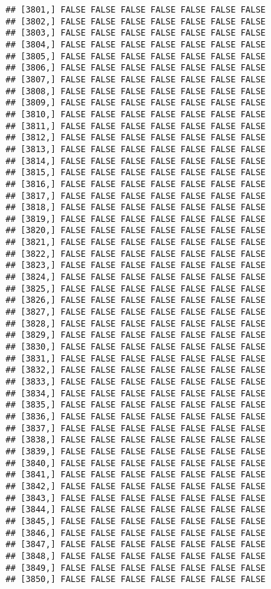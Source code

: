 \documentclass[
]{article}
\begin{document}
\begin{verbatim}
## [3801,] FALSE FALSE FALSE FALSE FALSE FALSE FALSE
## [3802,] FALSE FALSE FALSE FALSE FALSE FALSE FALSE
## [3803,] FALSE FALSE FALSE FALSE FALSE FALSE FALSE
## [3804,] FALSE FALSE FALSE FALSE FALSE FALSE FALSE
## [3805,] FALSE FALSE FALSE FALSE FALSE FALSE FALSE
## [3806,] FALSE FALSE FALSE FALSE FALSE FALSE FALSE
## [3807,] FALSE FALSE FALSE FALSE FALSE FALSE FALSE
## [3808,] FALSE FALSE FALSE FALSE FALSE FALSE FALSE
## [3809,] FALSE FALSE FALSE FALSE FALSE FALSE FALSE
## [3810,] FALSE FALSE FALSE FALSE FALSE FALSE FALSE
## [3811,] FALSE FALSE FALSE FALSE FALSE FALSE FALSE
## [3812,] FALSE FALSE FALSE FALSE FALSE FALSE FALSE
## [3813,] FALSE FALSE FALSE FALSE FALSE FALSE FALSE
## [3814,] FALSE FALSE FALSE FALSE FALSE FALSE FALSE
## [3815,] FALSE FALSE FALSE FALSE FALSE FALSE FALSE
## [3816,] FALSE FALSE FALSE FALSE FALSE FALSE FALSE
## [3817,] FALSE FALSE FALSE FALSE FALSE FALSE FALSE
## [3818,] FALSE FALSE FALSE FALSE FALSE FALSE FALSE
## [3819,] FALSE FALSE FALSE FALSE FALSE FALSE FALSE
## [3820,] FALSE FALSE FALSE FALSE FALSE FALSE FALSE
## [3821,] FALSE FALSE FALSE FALSE FALSE FALSE FALSE
## [3822,] FALSE FALSE FALSE FALSE FALSE FALSE FALSE
## [3823,] FALSE FALSE FALSE FALSE FALSE FALSE FALSE
## [3824,] FALSE FALSE FALSE FALSE FALSE FALSE FALSE
## [3825,] FALSE FALSE FALSE FALSE FALSE FALSE FALSE
## [3826,] FALSE FALSE FALSE FALSE FALSE FALSE FALSE
## [3827,] FALSE FALSE FALSE FALSE FALSE FALSE FALSE
## [3828,] FALSE FALSE FALSE FALSE FALSE FALSE FALSE
## [3829,] FALSE FALSE FALSE FALSE FALSE FALSE FALSE
## [3830,] FALSE FALSE FALSE FALSE FALSE FALSE FALSE
## [3831,] FALSE FALSE FALSE FALSE FALSE FALSE FALSE
## [3832,] FALSE FALSE FALSE FALSE FALSE FALSE FALSE
## [3833,] FALSE FALSE FALSE FALSE FALSE FALSE FALSE
## [3834,] FALSE FALSE FALSE FALSE FALSE FALSE FALSE
## [3835,] FALSE FALSE FALSE FALSE FALSE FALSE FALSE
## [3836,] FALSE FALSE FALSE FALSE FALSE FALSE FALSE
## [3837,] FALSE FALSE FALSE FALSE FALSE FALSE FALSE
## [3838,] FALSE FALSE FALSE FALSE FALSE FALSE FALSE
## [3839,] FALSE FALSE FALSE FALSE FALSE FALSE FALSE
## [3840,] FALSE FALSE FALSE FALSE FALSE FALSE FALSE
## [3841,] FALSE FALSE FALSE FALSE FALSE FALSE FALSE
## [3842,] FALSE FALSE FALSE FALSE FALSE FALSE FALSE
## [3843,] FALSE FALSE FALSE FALSE FALSE FALSE FALSE
## [3844,] FALSE FALSE FALSE FALSE FALSE FALSE FALSE
## [3845,] FALSE FALSE FALSE FALSE FALSE FALSE FALSE
## [3846,] FALSE FALSE FALSE FALSE FALSE FALSE FALSE
## [3847,] FALSE FALSE FALSE FALSE FALSE FALSE FALSE
## [3848,] FALSE FALSE FALSE FALSE FALSE FALSE FALSE
## [3849,] FALSE FALSE FALSE FALSE FALSE FALSE FALSE
## [3850,] FALSE FALSE FALSE FALSE FALSE FALSE FALSE

\end{verbatim}
\end{document}
